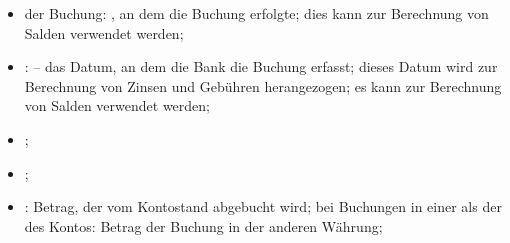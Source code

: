 \begin{itemize}
	\item {} der Buchung: , an dem die Buchung erfolgte; dies kann zur Berechnung von Salden verwendet werden;
	\item {}:  – das Datum, an dem die Bank die Buchung erfasst; dieses Datum wird zur Berechnung von Zinsen und Gebühren herangezogen; es kann zur Berechnung von Salden verwendet werden;
	\item {};
	\item {};
	\item {}: Betrag, der vom Kontostand abgebucht wird; bei Buchungen in einer  als der des Kontos: Betrag der Buchung in der anderen Währung;

\end{itemize}
